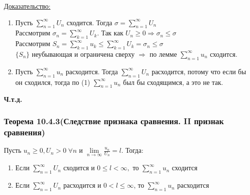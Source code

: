 \documentclass[12pt]{article}
\let\oldsum\sum
\let\oldlim\lim
\renewcommand{\sum}{\oldsum\limits}
\renewcommand{\lim}{\oldlim\limits}
\begin{document}
  \underline{Доказательство:}
  \begin{adjustwidth}{1.5em}{1.5em}
    \begin{enumerate}
      \item Пусть $\sum_{n=1}^{\infty} U_n$ сходится. Тогда $\sigma = \sum_{n=1}^{\infty}U_n$\\
      Рассмотрим $\sigma_n = \sum_{k=1}^{\infty} U_k$. Так как $U_n \geq 0 \Rightarrow \sigma_n \leq \sigma$\\
      Рассмотрим $S_n = \sum_{k=1}^{\infty} u_k \leq \sum_{k=1}^{\infty} U_k = \sigma_n \leq \sigma$\\
      $\{S_n\}$ неубывающая и ограничена сверху $\Rightarrow$ по лемме $\sum_{n=1}^{\infty}u_n$ сходится.
      \item Пусть $\sum_{n=1}^{\infty} u_n$ расходится. Тогда $\sum_{n=1}^{\infty} U_n$ расходится, потому что если бы он 
      сходился, тогда по (1) $\sum_{n=1}^{\infty} u_n$ был бы сходящимся, а  это не так.
    \end{enumerate}
  \end{adjustwidth}
  \begin{center}
    \textbf{Ч.т.д.}
  \end{center}

  \subsubsection*{Теорема 10.4.3(Следствие признака сравнения. II признак сравнения)}\label{th:10.4.3}
  \par\noindent
  Пусть $u_n \geq 0, U_n >0 \; \forall n$ и $\lim_{n \to \infty} \frac{u_n}{U_n} = l$.
  Тогда:
  \begin{enumerate}
    \item Если $\sum_{n=1}^{\infty} U_n$ сходится и $0\leq l < \infty,$ то $\sum_{n=1}^{\infty} u_n$ сходится\\
    \item Если $\sum_{n=1}^{\infty} U_n$ расходится и $0 < l \leq \infty$, то $\sum_{n=1}^{\infty}u_n$ расходится
  \end{enumerate}
\end{document}
